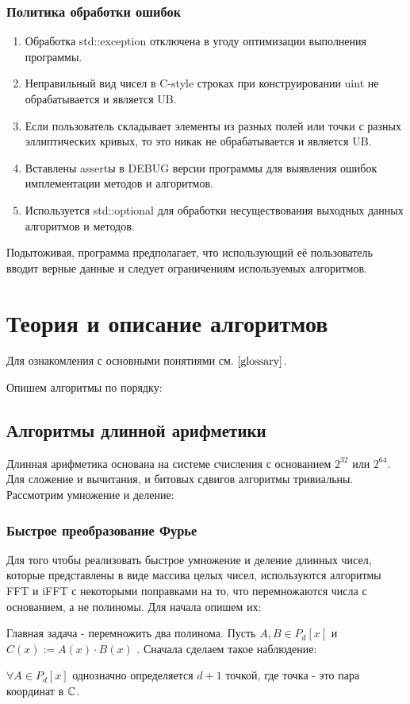\documentclass{article}
\begin{document}
\subsubsection{Политика обработки ошибок}
\begin{enumerate}
  \item Обработка std::exception отключена в угоду оптимизации выполнения программы.
  \item Неправильный вид чисел в C-style строках при конструировании uint не обрабатывается и является UB.   \item Если пользователь складывает элементы из разных полей или точки с разных эллиптических кривых, то это никак не обрабатывается и является UB.
  \item Вставлены assertы в DEBUG версии программы для выявления ошибок имплементации методов и алгоритмов.
  \item Используется std::optional для обработки несуществования выходных данных алгоритмов и методов.
\end{enumerate}
Подытоживая, программа предполагает, что использующий её пользователь вводит верные данные и следует ограничениям используемых алгоритмов.
\section{Теория и описание алгоритмов}
    Для ознакомления с основными понятиями см. $\ref{glossary}$. 

    Опишем алгоритмы по порядку:
  \subsection{Алгоритмы длинной арифметики}
    Длинная арифметика основана на системе счисления с основанием $2^{32}$ или $2^{64}$. Для сложение и вычитания, и битовых сдвигов алгоритмы тривиальны. Рассмотрим умножение и деление:
  \subsubsection{Быстрое преобразование Фурье}
  Для того чтобы реализовать быстрое умножение и деление длинных чисел, которые представлены в виде массива целых чисел, используются алгоритмы FFT и iFFT с некоторыми поправками на то, что перемножаются числа с основанием, а не полиномы. Для начала опишем их:

  Главная задача - перемножить два полинома. Пусть $A,B\in P_d[x]$ и $C(x):=A(x)\cdot B(x)$ . Сначала сделаем такое наблюдение:
  \begin{lemma}
    $\forall A\in P_{d}[x]$ однозначно определяется $d+1$ точкой, где точка - это пара координат в $\mathbb{C}$.
  \end{lemma}
\end{document}

